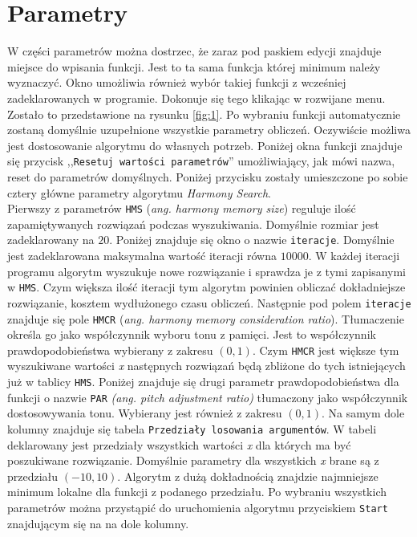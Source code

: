 \documentclass[10pt, a4paper]{article}
\begin{document}
\section{Parametry}
\label{subsec:parametry}
W części parametrów można dostrzec, że zaraz pod paskiem edycji znajduje miejsce do wpisania funkcji. Jest to ta sama funkcja której minimum należy wyznaczyć. Okno umożliwia również wybór takiej funkcji z wcześniej zadeklarowanych w programie. Dokonuje się tego klikając w rozwijane menu. Zostało to przedstawione na rysunku \ref{fig:1}. Po wybraniu funkcji automatycznie zostaną domyślnie uzupełnione wszystkie parametry obliczeń. Oczywiście możliwa jest dostosowanie algorytmu do własnych potrzeb. Poniżej okna funkcji znajduje się przycisk ,,{\tt Resetuj wartości parametrów}'' umożliwiający, jak mówi nazwa, reset do parametrów domyślnych. Poniżej przycisku zostały umieszczone po sobie cztery główne parametry algorytmu {\em Harmony Search}. \\
Pierwszy z parametrów {\tt HMS} ({\em ang. harmony memory size}) reguluje ilość zapamiętywanych rozwiązań podczas wyszukiwania. Domyślnie rozmiar jest zadeklarowany na $20$. Poniżej znajduje się okno o nazwie {\tt iteracje}. Domyślnie jest zadeklarowana maksymalna wartość iteracji równa $10000$. W każdej iteracji programu algorytm wyszukuje nowe rozwiązanie i sprawdza je z tymi zapisanymi w {\tt HMS}. Czym większa ilość iteracji tym algorytm powinien obliczać dokładniejsze rozwiązanie, kosztem wydłużonego czasu obliczeń. Następnie pod polem {\tt iteracje} znajduje się pole {\tt HMCR} ({\em ang. harmony memory consideration ratio}). Tłumaczenie określa go jako współczynnik wyboru tonu z pamięci. Jest to współczynnik prawdopodobieństwa wybierany z zakresu $(0, 1)$. Czym {\tt HMCR} jest większe tym wyszukiwane wartości {\em x} następnych rozwiązań będą zbliżone do tych istniejących już w tablicy {\tt HMS}. Poniżej znajduje się drugi parametr prawdopodobieństwa dla funkcji o nazwie {\tt PAR} {\em(ang. pitch adjustment ratio)} tłumaczony jako współczynnik dostosowywania tonu. Wybierany jest również z zakresu $(0, 1)$. Na samym dole kolumny znajduje się tabela {\tt Przedziały losowania argumentów}. W tabeli deklarowany jest przedziały wszystkich wartości {\em x} dla których ma być poszukiwane rozwiązanie. Domyślnie parametry dla wszystkich {\em x} brane są z przedziału $(-10, 10)$. Algorytm z dużą dokładnością znajdzie najmniejsze minimum lokalne dla funkcji z podanego przedziału. Po wybraniu wszystkich parametrów można przystąpić do uruchomienia algorytmu przyciskiem {\tt Start} znajdującym się na na dole kolumny.
\end{document}
